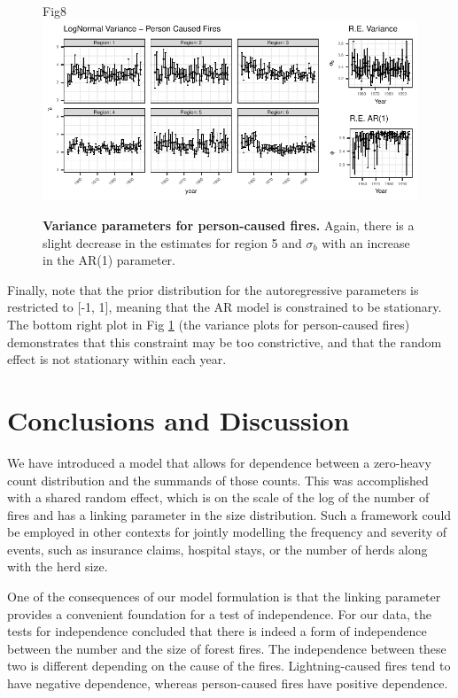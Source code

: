 \documentclass[10pt,letterpaper]{article}
\begin{document}
\begin{figure}[h!]
\centering
Fig8
\includegraphics[width=\textwidth]{Joint_Count_Files/sigestp-1.pdf}
\caption{\label{sigestp}\textbf{Variance parameters for person-caused fires.}
Again, there is a slight decrease in the estimates for region 5 and
\(\sigma_b\) with an increase in the AR(1) parameter.}
\end{figure}

Finally, note that the prior distribution for the autoregressive
parameters is restricted to {[}-1, 1{]}, meaning that the AR model is
constrained to be stationary. The bottom right plot in Fig
\ref{sigestp} (the variance plots for person-caused fires) demonstrates
that this constraint may be too constrictive, and that the random effect
is not stationary within each year.

\hypertarget{conclusions-and-discussion}{%
\section{Conclusions and Discussion}\label{conclusions-and-discussion}}

We have introduced a model that allows for dependence between a zero-heavy count distribution and the summands of those counts. This was accomplished
with a shared random effect, which is on the scale of the log of the
number of fires and has a linking parameter in the size
distribution. Such a framework could be employed in other contexts for
jointly modelling the frequency and severity of events, such as
insurance claims, hospital stays, or the number of herds along with the herd size.

One of the consequences of our model formulation is that the linking parameter provides a convenient foundation for a test of
independence. For our data, the tests for independence concluded that
there is indeed a form of independence between the number and the size
of forest fires. The independence between these two is different depending
on the cause of the fires. Lightning-caused fires tend to have negative
dependence, whereas person-caused fires have positive dependence.
\end{document}
